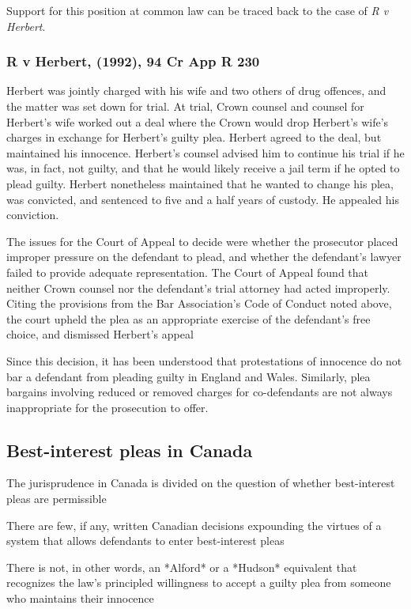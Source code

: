 Support for this position at common law can be traced back to the case of \textit{R v Herbert}.

\subsubsection{R v Herbert, (1992), 94 Cr App R 230}

Herbert was jointly charged with his wife and two others of drug offences, and the matter was set down for trial. At trial, Crown counsel and counsel for Herbert's wife worked out a deal where the Crown would drop Herbert's wife's charges in exchange for Herbert's guilty plea. Herbert agreed to the deal, but maintained his innocence. Herbert's counsel advised him to continue his trial if he was, in fact, not guilty, and that he would likely receive a jail term if he opted to plead guilty. Herbert nonetheless maintained that he wanted to change his plea, was convicted, and sentenced to five and a half years of custody. He appealed his conviction.

The issues for the Court of Appeal to decide were whether the prosecutor placed improper pressure on the defendant to plead, and whether the defendant's lawyer failed to provide adequate representation. The Court of Appeal found that neither Crown counsel nor the defendant's trial attorney had acted improperly. Citing the provisions from the Bar Association's Code of Conduct noted above, the court upheld the plea as an appropriate exercise of the defendant's free choice, and dismissed Herbert's appeal

Since this decision, it has been understood that protestations of innocence do not bar a defendant from pleading guilty in England and Wales. Similarly, plea bargains involving reduced or removed charges for co-defendants are not always inappropriate for the prosecution to offer.

\subsection{Best-interest pleas in Canada}

The jurisprudence in Canada is divided on the question of whether best-interest pleas are permissible

There are few, if any, written Canadian decisions expounding the virtues of a system that allows defendants to enter best-interest pleas

There is not, in other words, an *Alford* or a *Hudson* equivalent that recognizes the law's principled willingness to accept a guilty plea from someone who maintains their innocence

